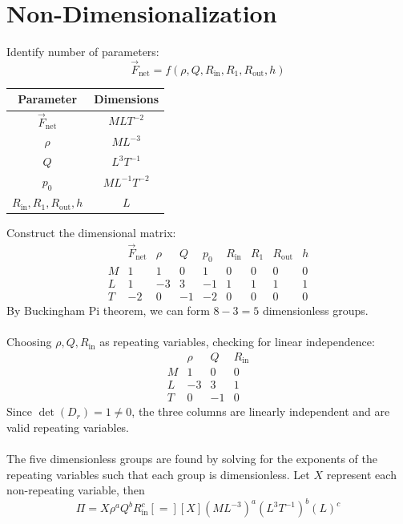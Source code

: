 \documentclass[11pt]{article}
\begin{document}
\section*{Non-Dimensionalization}
Identify number of parameters:
\[\vec{F}_\text{net} = f(\rho, Q, R_{\mathrm{in}}, R_1, R_{\mathrm{out}}, h)\]
\begin{table}[H]
    \centering
    \begin{tabular}{c c}
        \hline
        Parameter & Dimensions \\
        \hline
        $\vec{F}_\text{net}$ & $MLT^{-2}$ \\
        $\rho$ & $ML^{-3}$ \\
        $Q$ & $L^3T^{-1}$ \\
        $p_0$ & $ML^{-1}T^{-2}$ \\
        $R_{\mathrm{in}}, R_1, R_{\mathrm{out}}, h$ & $L$ \\
        \hline
    \end{tabular}
\end{table}
Construct the dimensional matrix:
\[
\begin{array}{c|cccccccc}
 & \vec{F}_\text{net} & \rho & Q & p_0
 & R_{\mathrm{in}} & R_1 & R_{\mathrm{out}} & h \\
\hline
M & 1 & 1 & 0 & 1 & 0 & 0 & 0 & 0 \\
L & 1 & -3 & 3 & -1 & 1 & 1 & 1 & 1 \\
T & -2 & 0 & -1 & -2 & 0 & 0 & 0 & 0
\end{array}
\]
By Buckingham Pi theorem, we can form $8-3=5$ dimensionless groups.\\\\
Choosing $\rho, Q, R_\text{in}$ as repeating variables, checking for linear independence:
\[
\begin{array}{c|ccc}
 & \rho & Q & R_{\mathrm{in}} \\
\hline
M & 1 & 0 & 0 \\
L & -3 & 3 & 1 \\
T & 0 & -1 & 0
\end{array}
\]
Since $\det(D_r)=1\neq 0$, the three columns are linearly independent and are valid repeating variables.\\\\
The five dimensionless groups are found by solving for the exponents of the repeating variables such that each group is dimensionless. Let $X$ represent each non-repeating variable, then
\[
\boxed{\Pi=X\rho^a Q^b R_{\mathrm{in}}^c [=] [X] (ML^{-3})^a (L^3T^{-1})^b (L)^c }
\]
\end{document}
